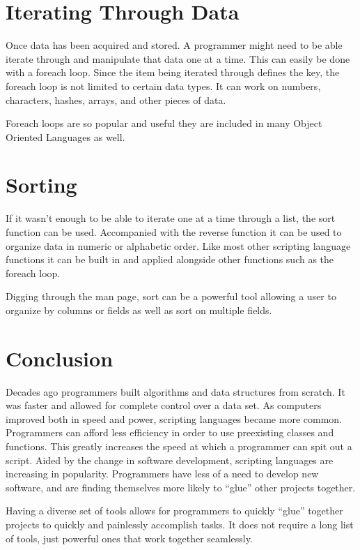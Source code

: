 \documentclass[11pt]{paper}
\begin{document}
\section{Iterating Through Data}
Once data has been acquired and stored. A programmer might need to be able iterate through and manipulate that data one at a time. This can easily be done with a foreach loop. Since the item being iterated through defines the key, the foreach loop is not limited to certain data types. It can work on numbers, characters, hashes, arrays, and other pieces of data. 

\indent
Foreach loops are so popular and useful they are included in many Object Oriented Languages as well.

\section{Sorting}
If it wasn’t enough to be able to iterate one at a time through a list, the sort function can be used. Accompanied with the reverse function it can be used to organize data in numeric or alphabetic order. Like most other scripting language functions it can be built in and applied alongside other functions such as the foreach loop. 

\indent
Digging through the man page, sort can be a powerful tool allowing a user to organize by columns or fields as well as sort on multiple fields. 

\section{Conclusion}
Decades ago programmers built algorithms and data structures from scratch. It was faster and allowed for complete control over a data set. As computers improved both in speed and power, scripting languages became more common. Programmers can afford less efficiency in order to use preexisting classes and functions. This greatly increases the speed at which a programmer can spit out a script. Aided by the change in software development, scripting languages are increasing in popularity. Programmers have less of a need to develop new software, and are finding themselves more likely to ``glue'' other projects together. 


\indent
Having a diverse set of tools allows for programmers to quickly ``glue'' together projects to quickly and painlessly accomplish tasks. It does not require a long list of tools, just powerful ones that work together seamlessly. 
\end{document}
